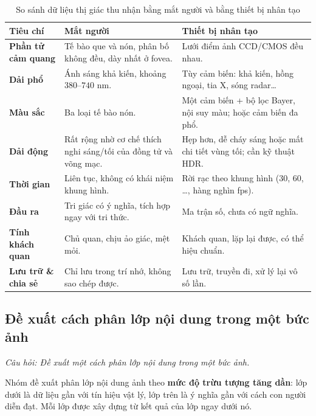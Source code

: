 \begin{table}[ht]
\centering
\small
\caption{So sánh dữ liệu thị giác thu nhận bằng mắt người và bằng thiết bị nhân tạo}
\label{tab:w1_eye}
\renewcommand{\arraystretch}{1.3}
\begin{tabularx}{\textwidth}{|p{2.6cm}|X|X|}
\hline
\textbf{Tiêu chí} & \textbf{Mắt người} & \textbf{Thiết bị nhân tạo} \\
\hline
\textbf{Phần tử cảm quang} & Tế bào que và nón, phân bố không đều, dày nhất ở fovea. & Lưới điểm ảnh CCD/CMOS đều nhau. \\
\hline
\textbf{Dải phổ} & Ánh sáng khả kiến, khoảng $380$--$740$ nm. & Tùy cảm biến: khả kiến, hồng ngoại, tia X, sóng radar\ldots \\
\hline
\textbf{Màu sắc} & Ba loại tế bào nón. & Một cảm biến + bộ lọc Bayer, nội suy màu; hoặc cảm biến đa phổ. \\
\hline
\textbf{Dải động} & Rất rộng nhờ cơ chế thích nghi sáng/tối của đồng tử và võng mạc. & Hẹp hơn, dễ cháy sáng hoặc mất chi tiết vùng tối; cần kỹ thuật HDR. \\
\hline
\textbf{Thời gian} & Liên tục, không có khái niệm khung hình. & Rời rạc theo khung hình (30, 60, \ldots, hàng nghìn fps). \\
\hline
\textbf{Đầu ra} & Tri giác có ý nghĩa, tích hợp ngay với tri thức. & Ma trận số, chưa có ngữ nghĩa. \\
\hline
\textbf{Tính khách quan} & Chủ quan, chịu ảo giác, mệt mỏi. & Khách quan, lặp lại được, có thể hiệu chuẩn. \\
\hline
\textbf{Lưu trữ \& chia sẻ} & Chỉ lưu trong trí nhớ, không sao chép được. & Lưu trữ, truyền đi, xử lý lại vô số lần. \\
\hline
\end{tabularx}
\end{table}

\subsection{Đề xuất cách phân lớp nội dung trong một bức ảnh}
\label{subsec:w1_layers}

\textit{Câu hỏi: Đề xuất một cách phân lớp nội dung trong một bức ảnh.}

Nhóm đề xuất phân lớp nội dung ảnh theo \textbf{mức độ trừu tượng tăng dần}: lớp dưới là dữ liệu gần với tín hiệu vật lý, lớp trên là ý nghĩa gần với cách con người diễn đạt. Mỗi lớp được xây dựng từ kết quả của lớp ngay dưới nó.

